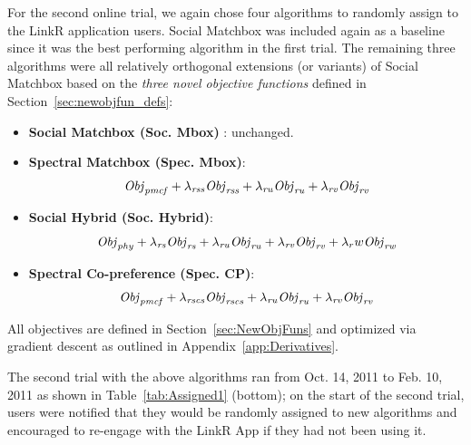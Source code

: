 For the second online trial, we again chose four algorithms to
randomly assign to the LinkR application users.  Social Matchbox
was included again as a baseline since it was the best performing
algorithm in the first trial.  The remaining three algorithms
were all relatively orthogonal extensions (or variants) of Social Matchbox
based on the \emph{three novel objective functions} defined in 
Section~\ref{sec:newobjfun_defs}:
\begin{itemize}
\item {\bf Social Matchbox (Soc. Mbox)} : unchanged.
\item {\bf Spectral Matchbox (Spec. Mbox)}: 
$$\mathit{Obj}_{\mathit{pmcf}} + \lambda_{\mathit{rss}} \mathit{Obj}_{\mathit{rss}} + \lambda_{\mathit{ru}} \mathit{Obj}_{\mathit{ru}} + \lambda_{\mathit{rv}} \mathit{Obj}_{\mathit{rv}}$$
\item {\bf Social Hybrid (Soc. Hybrid)}: 
$$\mathit{Obj}_{\mathit{phy}} + \lambda_{\mathit{rs}} \mathit{Obj}_{\mathit{rs}} + \lambda_{\mathit{ru}} \mathit{Obj}_{\mathit{ru}} + \lambda_{\mathit{rv}} \mathit{Obj}_{\mathit{rv}} + \lambda_rw \mathit{Obj}_{\mathit{rw}}$$
\item {\bf Spectral Co-preference (Spec. CP)}: 
$$\mathit{Obj}_{\mathit{pmcf}} + \lambda_{\mathit{rscs}} \mathit{Obj}_{\mathit{rscs}} + \lambda_{\mathit{ru}} \mathit{Obj}_{\mathit{ru}} + \lambda_{\mathit{rv}} \mathit{Obj}_{\mathit{rv}}$$
\end{itemize}
All objectives are defined in Section~\ref{sec:NewObjFuns} 
and optimized via gradient descent as outlined
in Appendix~\ref{app:Derivatives}.  

The second trial with the above algorithms ran from Oct. 14, 2011 to
Feb. 10, 2011 as shown in Table~\ref{tab:Assigned1} (bottom); on the
start of the second trial, users were notified that they would be
randomly assigned to new algorithms and encouraged to re-engage with
the LinkR App if they had not been using it.


